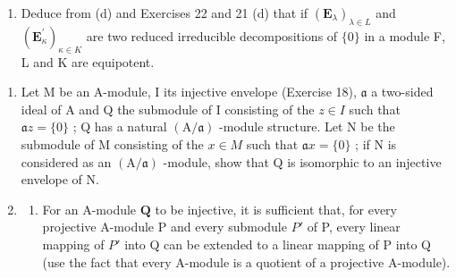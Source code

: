 \begin{enumerate}
  Let \((\mathrm{N}_{\kappa})_{\kappa\in K}\) be a family of indecomposable submodules of M of which M is the direct sum; every \(N_{\kappa}\) is therefore isomorphic to an \(M_{\lambda}\) and vice versa, by virtue of (c). Let T be the set of classes of indecomposable submodules of M (under the relation of isomorphism) such that an \(M_{\lambda}\) (or an \(N_{\kappa}\) ) belongs to one of these classes. For all \(t\in T\) , let \(\mathrm{R}(t)\) (resp. \(\mathrm{S}(t)\) ) be the set of \(\lambda\in L\) (resp. \(\kappa\in K\) ) such that \(M_{\lambda}\in t\) (resp. \(N_{\kappa}\in t\) ). Show that, for all \(t\in T\) , \(\mathrm{Card}(\mathrm{R}(t))=\mathrm{Card}(\mathrm{S}(t))\) . (In the notation of (a), let \(\mathrm{J}(\kappa)\) be the set of \(\lambda\in L\) such that the restriction of \(\pi_{\lambda}\) to \(N_{\kappa}\) is an isomorphism of \(N_{\kappa}\) onto \(M_{\lambda}\) ; show that \(\mathrm{J}(\kappa)\) is finite and that the \(\mathrm{J}(\kappa)\) cover \(\mathrm{R}(t)\) when \(\kappa\) runs through \(\mathrm{S}(t)\) . Deduce that \(\mathrm{Card}(\mathrm{S}(t))\leqslant\mathrm{Card}(\mathrm{R}(t))\) when \(\mathrm{R}(t)\) is infinite. When \(\mathrm{R}(t)\) is finite, show with the aid of (a) that M is the direct sum of the \(M_{\lambda}\) for \(\lambda\notin R(t)\) and a subfamily of \((\mathrm{N}_{\kappa})_{\kappa\in\mathrm{S}(t)}\) of cardinal equal to that of \(\mathrm{R}(t)\) .
\item
  Deduce from (d) and Exercises 22 and 21 (d) that if \((\mathbf{E}_{\lambda})_{\lambda \in L}\) and \((\mathbf{E}_{\kappa}^{\prime})_{\kappa \in K}\) are two reduced irreducible decompositions of \(\{0\}\) in a module F, L and K are equipotent.
\end{enumerate}

\begin{enumerate}
\def\labelenumi{\arabic{enumi}.}
\setcounter{enumi}{23}
\item
  Let M be an A-module, I its injective envelope (Exercise 18), \(\mathfrak{a}\) a two-sided ideal of A and Q the submodule of I consisting of the \(z \in I\) such that \(\mathfrak{a}z = \{0\}\) ; Q has a natural \((\mathrm{A}/\mathfrak{a})\) -module structure. Let N be the submodule of M consisting of the \(x \in M\) such that \(\mathfrak{a}x = \{0\}\) ; if N is considered as an \((\mathrm{A}/\mathfrak{a})\) -module, show that Q is isomorphic to an injective envelope of N.
\item
  \begin{enumerate}
  \def\labelenumii{(\alph{enumii})}
  \tightlist
  \item
    For an A-module \(\mathbf{Q}\) to be injective, it is sufficient that, for every projective A-module P and every submodule \(P'\) of P, every linear mapping of \(P'\) into Q can be extended to a linear mapping of P into Q (use the fact that every A-module is a quotient of a projective A-module).
  \end{enumerate}
\end{enumerate}


